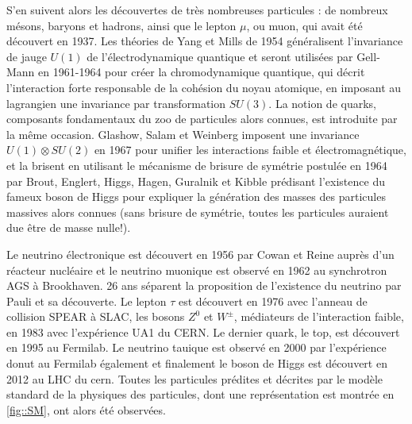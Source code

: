       S'en suivent alors les découvertes de très nombreuses particules : de nombreux mésons, baryons et  hadrons, ainsi que le lepton $\mu$, ou muon, qui avait été découvert en 1937\cite{Street1937}. Les théories de Yang et Mills de 1954\cite{Yang1954} généralisent l'invariance de jauge $U(1)$ de l'électrodynamique quantique et seront utilisées par Gell-Mann en 1961-1964\cite{Glashow1961,Gell-Mann1964} pour créer la chromodynamique quantique, qui décrit l'interaction forte responsable de la cohésion du noyau atomique, en imposant au lagrangien une invariance par transformation $SU(3)$. La notion de quarks, composants fondamentaux du zoo de particules alors connues, est introduite par la même occasion. Glashow, Salam et Weinberg imposent une invariance $U(1)\otimes SU(2)$ en 1967\cite{Glashow1961a,Salam1964,Weinberg1967} pour unifier les interactions faible et électromagnétique, et la brisent en utilisant le mécanisme de brisure de symétrie postulée en 1964 par  Brout, Englert, Higgs, Hagen, Guralnik et Kibble\cite{Englert1964,Higgs1964,Higgs1964a,Kibble1967} prédisant l'existence du fameux boson de Higgs pour expliquer la génération des masses des particules massives alors connues (sans brisure de symétrie, toutes les particules auraient due être de masse nulle!). 

      Le neutrino électronique est découvert en 1956 par Cowan et Reine\cite{Cowan1956} auprès d'un réacteur nucléaire et le neutrino muonique est observé en 1962\cite{Danby1962} au synchrotron AGS à Brookhaven. 26 ans séparent la proposition de l'existence du neutrino par Pauli et sa découverte. Le lepton $\tau$ est découvert en 1976\cite{Perl1975} avec l'anneau de collision SPEAR à SLAC, les bosons $Z^0$ et $W^{\pm}$, médiateurs de l'interaction faible, en 1983\cite{Arnison1983,Arnison1983a} avec l'expérience UA1 du CERN. Le dernier quark, le top, est découvert en 1995\cite{Collaboration1995} au Fermilab. Le neutrino tauique est observé en 2000 par l'expérience \gls{donut}\cite{Collaboration2000} au Fermilab également et finalement le boson de Higgs est découvert en 2012 au LHC du \gls{cern}\cite{Collaboration2012}. Toutes les particules prédites et décrites par le modèle standard de la physiques des particules, dont une représentation est montrée en \autoref{fig::SM}, ont alors été observées. 


